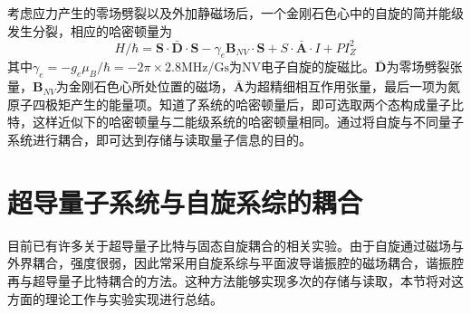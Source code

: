             考虑应力产生的零场劈裂以及外加静磁场后，一个金刚石色心中的自旋的简并能级发生分裂，相应的哈密顿量为\cite{grezes2016towards}
            \begin{equation}
            \label{eqn:NV_hamiltonian}
                H/\hbar = \bm S \cdot \bar{\bm D} \cdot \bm S - \gamma_e \bm B_{NV} \cdot \bm S + S \cdot \bar{\bm A}\cdot I +P I_Z^2
            \end{equation}
            其中$ \gamma_e = -g_e \mu_B /\hbar = -2\pi \times 2.8 \mathrm{MHz/Gs} $为NV电子自旋的旋磁比。$\bar{\bm D} $为零场劈裂张量，$\bm B_{NV} $为金刚石色心所处位置的磁场，$\bar{\bm A}$为超精细相互作用张量，最后一项为氮原子四极矩产生的能量项。知道了系统的哈密顿量后，即可选取两个态构成量子比特，这样近似下的哈密顿量与二能级系统的哈密顿量相同。通过将自旋与不同量子系统进行耦合，即可达到存储与读取量子信息的目的。
            




            

        \section{超导量子系统与自旋系综的耦合} %
        \label{sec:simulation_experimental_works}

            目前已有许多关于超导量子比特与固态自旋耦合的相关实验。由于自旋通过磁场与外界耦合，强度很弱，因此常采用自旋系综与平面波导谐振腔的磁场耦合，谐振腔再与超导量子比特耦合的方法\cite{grezes2016towards}。这种方法能够实现多次的存储与读取，本节将对这方面的理论工作与实验实现进行总结。


